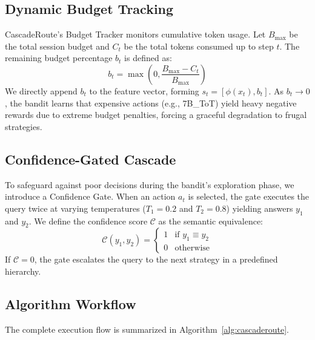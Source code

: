 \documentclass{article} %
\begin{document}
\subsection{Dynamic Budget Tracking}
CascadeRoute's Budget Tracker monitors cumulative token usage. Let $B_{\max}$ be the total session budget and $C_t$ be the total tokens consumed up to step $t$. The remaining budget percentage $b_t$ is defined as:
\begin{equation}
b_t = \max\left(0, \frac{B_{\max} - C_t}{B_{\max}}\right)
\end{equation}
We directly append $b_t$ to the feature vector, forming $s_t = [\phi(x_t), b_t]$. As $b_t \to 0$, the bandit learns that expensive actions (e.g., 7B\_ToT) yield heavy negative rewards due to extreme budget penalties, forcing a graceful degradation to frugal strategies.

\subsection{Confidence-Gated Cascade}
To safeguard against poor decisions during the bandit's exploration phase, we introduce a Confidence Gate. When an action $a_t$ is selected, the gate executes the query twice at varying temperatures ($T_1=0.2$ and $T_2=0.8$) yielding answers $y_1$ and $y_2$. We define the confidence score $\mathcal{C}$ as the semantic equivalence:
\begin{equation}
\mathcal{C}(y_1, y_2) = \begin{cases} 
      1 & \text{if } y_1 \equiv y_2 \\
      0 & \text{otherwise} 
   \end{cases}
\end{equation}
If $\mathcal{C} = 0$, the gate escalates the query to the next strategy in a predefined hierarchy.

\subsection{Algorithm Workflow}
The complete execution flow is summarized in Algorithm~\ref{alg:cascaderoute}.
\end{document}
